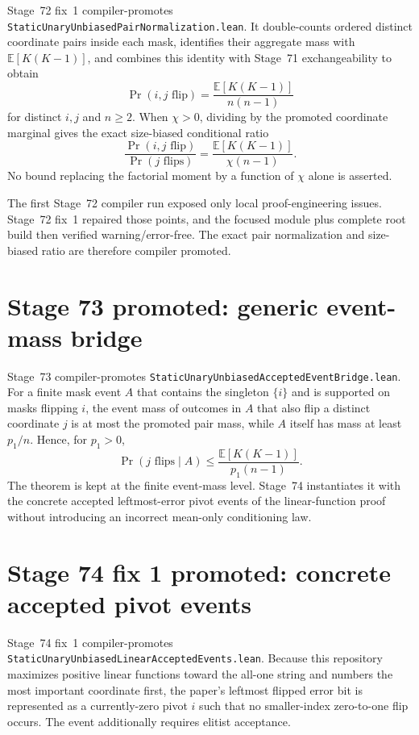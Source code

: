 \documentclass[11pt]{article}
\begin{document}
Stage~72 fix~1 compiler-promotes \texttt{StaticUnaryUnbiasedPairNormalization.lean}. It double-counts ordered distinct coordinate pairs inside each mask, identifies their aggregate mass with $\mathbb E[K(K-1)]$, and combines this identity with Stage~71 exchangeability to obtain
\[
  \Pr(i,j\text{ flip})=\frac{\mathbb E[K(K-1)]}{n(n-1)}
\]
for distinct $i,j$ and $n\ge2$. When $\chi>0$, dividing by the promoted coordinate marginal gives the exact size-biased conditional ratio
\[
  \frac{\Pr(i,j\text{ flip})}{\Pr(j\text{ flips})}
  =\frac{\mathbb E[K(K-1)]}{\chi(n-1)}.
\]
No bound replacing the factorial moment by a function of $\chi$ alone is asserted.

The first Stage~72 compiler run exposed only local proof-engineering issues. Stage~72 fix~1 repaired those points, and the focused module plus complete root build then verified warning/error-free. The exact pair normalization and size-biased ratio are therefore compiler promoted.

\section{Stage 73 promoted: generic event-mass bridge}

Stage~73 compiler-promotes \texttt{StaticUnaryUnbiasedAcceptedEventBridge.lean}. For a finite mask event $A$ that contains the singleton $\{i\}$ and is supported on masks flipping $i$, the event mass of outcomes in $A$ that also flip a distinct coordinate $j$ is at most the promoted pair mass, while $A$ itself has mass at least $p_1/n$. Hence, for $p_1>0$,
\[
  \Pr(j\text{ flips}\mid A)\le
  \frac{\mathbb E[K(K-1)]}{p_1(n-1)}.
\]
The theorem is kept at the finite event-mass level. Stage~74 instantiates it with the concrete accepted leftmost-error pivot events of the linear-function proof without introducing an incorrect mean-only conditioning law.


\section{Stage 74 fix 1 promoted: concrete accepted pivot events}

Stage~74 fix~1 compiler-promotes \texttt{StaticUnaryUnbiasedLinearAcceptedEvents.lean}. Because this repository maximizes positive linear functions toward the all-one string and numbers the most important coordinate first, the paper's leftmost flipped error bit is represented as a currently-zero pivot $i$ such that no smaller-index zero-to-one flip occurs. The event additionally requires elitist acceptance.
\end{document}
